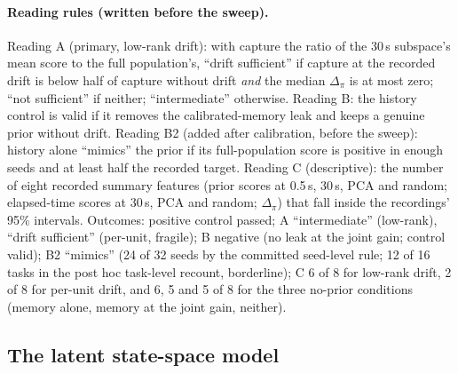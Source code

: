 \documentclass{article}
\begin{document}
\paragraph{Reading rules (written before the sweep).} Reading A (primary, low-rank drift): with capture the ratio of the
30\,s subspace's mean score to the full population's, ``drift sufficient'' if capture at the recorded drift is below
half of capture without drift \emph{and} the median $\Delta_\pi$ is at most zero; ``not sufficient'' if neither;
``intermediate'' otherwise. Reading B: the history control is valid if it removes the calibrated-memory leak and keeps
a genuine prior without drift. Reading B2 (added after calibration, before the sweep): history alone ``mimics'' the
prior if its full-population score is positive in enough seeds and at least half the recorded target. Reading C
(descriptive): the number of eight recorded summary features (prior scores at 0.5\,s, 30\,s, PCA and random;
elapsed-time scores at 30\,s, PCA and random; $\Delta_\pi$) that fall inside the recordings' 95\% intervals. Outcomes:
positive control passed; A ``intermediate'' (low-rank), ``drift sufficient'' (per-unit, fragile); B negative (no leak
at the joint gain; control valid); B2 ``mimics'' (24 of 32 seeds by the committed seed-level rule; 12 of 16 tasks in the post hoc task-level recount,
borderline); C 6 of 8 for low-rank drift, 2 of 8 for per-unit drift, and 6, 5 and 5 of 8 for the three no-prior
conditions (memory alone, memory at the joint gain, neither).

\subsection{The latent state-space model}
\label{app:lds}
\end{document}
